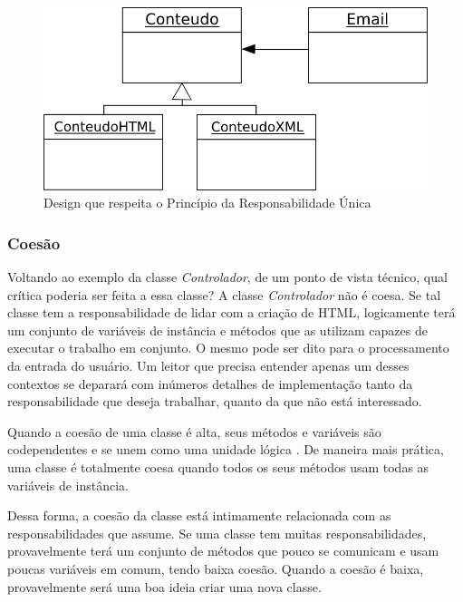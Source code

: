 \begin{figure}[!t]
\begin{centering}
\includegraphics[scale=0.7]{imagens/email.png}
\par\end{centering}

\caption{Design que respeita o Princípio da Responsabilidade Única \label{img:email}}

\end{figure}

\subsubsection{Coesão}
Voltando ao exemplo da classe \textit{Controlador}, de um ponto de vista técnico, qual crítica poderia ser feita a essa classe? 
A classe \textit{Controlador} não é coesa. Se tal classe tem a responsabilidade de lidar com a criação de HTML, logicamente terá um conjunto de variáveis de instância e métodos que as utilizam capazes de executar o trabalho em conjunto. O mesmo pode ser dito para o processamento da entrada do usuário. Um leitor que precisa entender apenas um desses contextos se deparará com inúmeros detalhes de implementação tanto da responsabilidade que deseja trabalhar, quanto da que não está interessado.
	
Quando a coesão de uma classe é alta, seus métodos e variáveis são codependentes e se unem como uma unidade lógica \citep{Beck2007}. De maneira mais prática, uma classe é totalmente coesa quando todos os seus métodos usam todas as variáveis de instância.
	
Dessa forma, a coesão da classe está intimamente relacionada com as responsabilidades que assume. Se uma classe tem muitas 
responsabilidades, provavelmente terá um conjunto de métodos que pouco se comunicam e usam poucas variáveis em comum, tendo baixa 
coesão. Quando a coesão é baixa, provavelmente será uma boa ideia criar uma nova classe.

